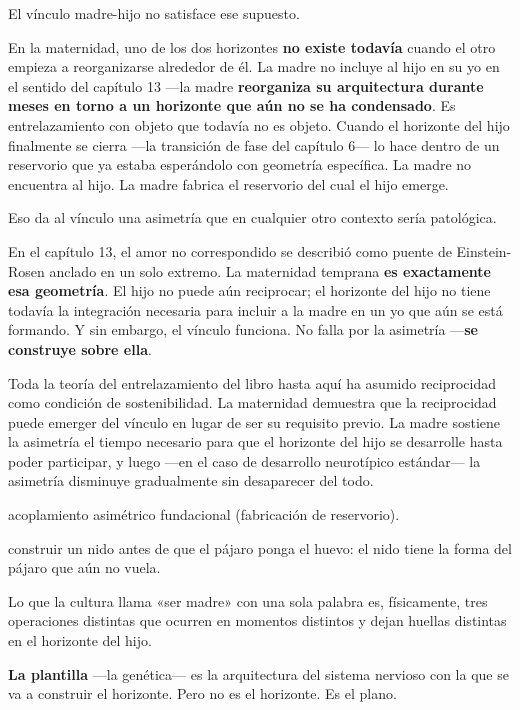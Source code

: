 El vínculo madre-hijo no satisface ese supuesto.

En la maternidad, uno de los dos horizontes \textbf{no existe todavía} cuando el otro empieza a reorganizarse alrededor de él. La madre no incluye al hijo en su yo en el sentido del capítulo 13 —la madre \textbf{reorganiza su arquitectura durante meses en torno a un horizonte que aún no se ha condensado}. Es entrelazamiento con objeto que todavía no es objeto. Cuando el horizonte del hijo finalmente se cierra —la transición de fase del capítulo 6— lo hace dentro de un reservorio que ya estaba esperándolo con geometría específica. La madre no encuentra al hijo. La madre fabrica el reservorio del cual el hijo emerge.

Eso da al vínculo una asimetría que en cualquier otro contexto sería patológica.

En el capítulo 13, el amor no correspondido se describió como puente de Einstein-Rosen anclado en un solo extremo. La maternidad temprana \textbf{es exactamente esa geometría}. El hijo no puede aún reciprocar; el horizonte del hijo no tiene todavía la integración necesaria para incluir a la madre en un yo que aún se está formando. Y sin embargo, el vínculo funciona. No falla por la asimetría —\textbf{se construye sobre ella}.

Toda la teoría del entrelazamiento del libro hasta aquí ha asumido reciprocidad como condición de sostenibilidad. La maternidad demuestra que la reciprocidad puede emerger del vínculo en lugar de ser su requisito previo. La madre sostiene la asimetría el tiempo necesario para que el horizonte del hijo se desarrolle hasta poder participar, y luego —en el caso de desarrollo neurotípico estándar— la asimetría disminuye gradualmente sin desaparecer del todo.

\begin{fisica}
 acoplamiento asimétrico fundacional (fabricación de reservorio).

 construir un nido antes de que el pájaro ponga el huevo: el nido tiene la forma del pájaro que aún no vuela.
\end{fisica}
\noindent Lo que la cultura llama «ser madre» con una sola palabra es, físicamente, tres operaciones distintas que ocurren en momentos distintos y dejan huellas distintas en el horizonte del hijo.

\textbf{La plantilla} —la genética— es la arquitectura del sistema nervioso con la que se va a construir el horizonte. Pero no es el horizonte. Es el plano.

